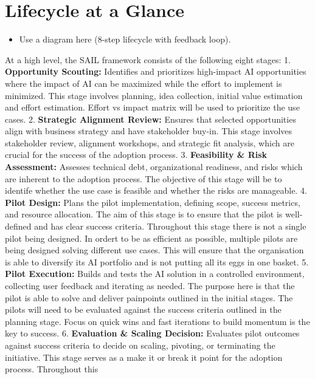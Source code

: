\documentclass[]{imc-inf}
\begin{document}
\section{Lifecycle at a Glance}\label{lifecycle-at-a-glance}

\begin{itemize}
	\item
	Use a diagram here (8-step lifecycle with feedback loop).
\end{itemize}

At a high level, the SAIL framework consists of the following eight
stages: 1. \textbf{Opportunity Scouting:} Identifies and prioritizes
high-impact AI opportunities where the impact of AI can be maximized
while the effort to implement is minimized. This stage involves
planning, idea collection, initial value estimation and effort
estimation. Effort vs impact matrix will be used to prioritize the use
cases. 2. \textbf{Strategic Alignment Review:} Ensures that selected
opportunities align with business strategy and have stakeholder buy-in.
This stage involves stakeholder review, alignment workshops, and
strategic fit analysis, which are crucial for the success of the
adoption process. 3. \textbf{Feasibility \& Risk Assessment:} Assesses
technical debt, organizational readiness, and risks which are inherent
to the adoption process. The objective of this stage will be to identife
whether the use case is feasible and whether the risks are manageable.
4. \textbf{Pilot Design:} Plans the pilot implementation, defining
scope, success metrics, and resource allocation. The aim of this stage
is to ensure that the pilot is well-defined and has clear success
criteria. Throughout this stage there is not a single pilot being
designed. In ordert to be as efficient as possible, multiple pilots are
being designed solving different use cases. This will ensure that the
organisation is able to diversify its AI portfolio and is not putting
all its eggs in one basket. 5. \textbf{Pilot Execution:} Builds and
tests the AI solution in a controlled environment, collecting user
feedback and iterating as needed. The purpose here is that the pilot is
able to solve and deliver painpoints outlined in the initial stages. The
pilots will need to be evaluated against the success criteria outlined
in the planning stage. Focus on quick wins and fast iterations to build
momentum is the key to success. 6. \textbf{Evaluation \& Scaling
	Decision:} Evaluates pilot outcomes against success criteria to decide
on scaling, pivoting, or terminating the initiative. This stage serves
as a make it or break it point for the adoption process. Throughout this
\end{document}

